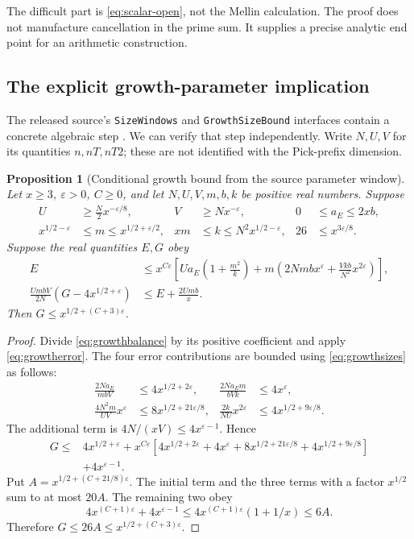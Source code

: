 \documentclass[11pt,letterpaper]{article}
\newtheorem{proposition}[theorem]{Proposition}
\theoremstyle{definition}
\theoremstyle{remark}
\numberwithin{equation}{section}
\begin{document}
The difficult part is \eqref{eq:scalar-open}, not the Mellin calculation. The proof does not manufacture cancellation in the prime sum. It supplies a precise analytic end point for an arithmetic construction.

\subsection{The explicit growth-parameter implication}
The released source's \texttt{SizeWindows} and \texttt{GrowthSizeBound} interfaces contain a concrete algebraic step \cite{externalgrowth}. We can verify that step independently. Write $N,U,V$ for its quantities $n,nT,nT2$; these are not identified with the Pick-prefix dimension.

\begin{proposition}[Conditional growth bound from the source parameter window]\label{prop:growth}
Let $x\ge3$, $\varepsilon>0$, $C\ge0$, and let $N,U,V,m,b,k$ be positive real numbers. Suppose
\begin{align}
 U&\ge\tfrac N2x^{-\varepsilon/8},&
 V&\ge Nx^{-\varepsilon},&
 0&\le a_E\le2xb,\label{eq:growthsizes}\\
 x^{1/2-\varepsilon}&\le m\le x^{1/2+\varepsilon/2},&
 xm&\le k\le N^2x^{1/2-\varepsilon},&
 26&\le x^{3\varepsilon/8}.\nonumber
\end{align}
Suppose the real quantities $E,G$ obey
\begin{align}
 E&\le x^{C\varepsilon}
 \left[Ua_E\left(1+\frac{m^2}{k}\right)
 +m\left(2Nmbx^\varepsilon+\frac{Vkb}{N^2}x^{2\varepsilon}\right)\right],
 \label{eq:growtherror}\\
 \frac{UmbV}{2N}\left(G-4x^{1/2+\varepsilon}\right)
 &\le E+\frac{2Umb}{x}.\label{eq:growthbalance}
\end{align}
Then $G\le x^{1/2+(C+3)\varepsilon}$.
\end{proposition}
\begin{proof}
Divide \eqref{eq:growthbalance} by its positive coefficient and apply \eqref{eq:growtherror}. The four error contributions are bounded using \eqref{eq:growthsizes} as follows:
\begin{align*}
 \frac{2Na_E}{mbV}&\le4x^{1/2+2\varepsilon},&
 \frac{2Na_Em}{bVk}&\le4x^\varepsilon,\\
 \frac{4N^2m}{UV}x^\varepsilon&\le8x^{1/2+21\varepsilon/8},&
 \frac{2k}{NU}x^{2\varepsilon}&\le4x^{1/2+9\varepsilon/8}.
\end{align*}
The additional term is $4N/(xV)\le4x^{\varepsilon-1}$. Hence
\begin{align*}
G\le{}&4x^{1/2+\varepsilon}
+x^{C\varepsilon}\left[
4x^{1/2+2\varepsilon}+4x^\varepsilon
+8x^{1/2+21\varepsilon/8}+4x^{1/2+9\varepsilon/8}\right]\\
&+4x^{\varepsilon-1}.
\end{align*}
Put $A=x^{1/2+(C+21/8)\varepsilon}$. The initial term and the three terms with a factor $x^{1/2}$ sum to at most $20A$. The remaining two obey
\[
4x^{(C+1)\varepsilon}+4x^{\varepsilon-1}
\le4x^{(C+1)\varepsilon}(1+1/x)\le6A.
\]
Therefore $G\le26A\le x^{1/2+(C+3)\varepsilon}$.
\end{proof}
\end{document}
